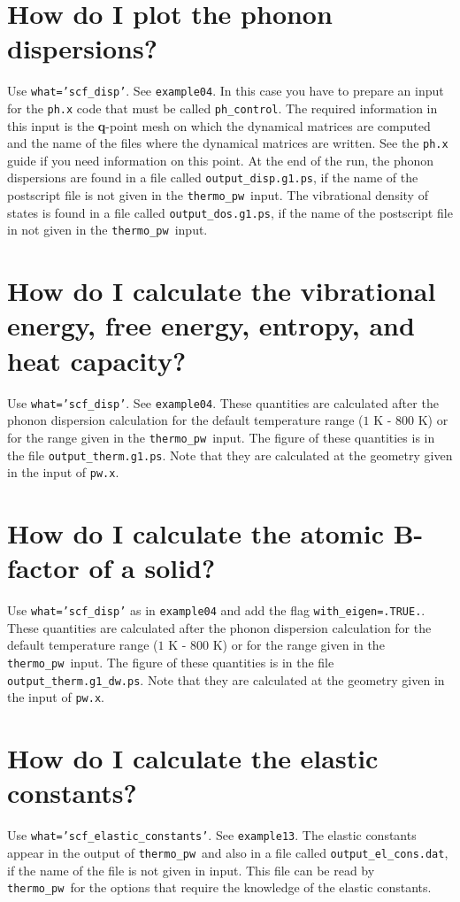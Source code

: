 \documentclass[12pt,a4paper]{article}
\def\thermo{\texttt{thermo\_pw}}
\begin{document}
\newpage
\section{\color{coral}How do I plot the phonon dispersions?}
Use \texttt{what='scf\_disp'}. See \texttt{example04}. In this case you
have to prepare an input for the \texttt{ph.x} code that must be
called \texttt{ph\_control}. The required information in this input
is the {\bf q}-point mesh on which the dynamical matrices are computed
and the name of the files where the dynamical matrices are written.
See the \texttt{ph.x} guide if you need information on this point.
At the end of the run, the phonon dispersions are found in a file 
called \texttt{output\_disp.g1.ps},
if the name of the postscript file is not given in the \thermo\ input.
The vibrational density of states is found in a file called 
\texttt{output\_dos.g1.ps}, if the name of the postscript file in not
given in the \thermo\ input.

\newpage
\section{\color{coral}How do I calculate the vibrational energy, 
free energy, entropy, and heat capacity?}
Use \texttt{what='scf\_disp'}. See \texttt{example04}. These quantities
are calculated after the phonon dispersion calculation for the default 
temperature range ($1$ K - $800$ K) or for the range
given in the \thermo\ input. The figure of these quantities is in the file 
\texttt{output\_therm.g1.ps}.
Note that they are calculated at the geometry given in the input
of \texttt{pw.x}.

\newpage
\section{\color{coral}How do I calculate the atomic B-factor of a solid?}
Use \texttt{what='scf\_disp'} as in \texttt{example04} and add the
flag \texttt{with\_eigen=.TRUE.}. These quantities
are calculated after the phonon dispersion calculation for the default 
temperature range ($1$ K - $800$ K) or for the range
given in the \thermo\ input. The figure of these quantities is in the file 
\texttt{output\_therm.g1\_dw.ps}.
Note that they are calculated at the geometry given in the input
of \texttt{pw.x}.

\newpage
\section{\color{coral}How do I calculate the elastic constants?}
Use \texttt{what='scf\_elastic\_constants'}. See \texttt{example13}. The
elastic constants appear in the output of \thermo\ and also in a file
called \texttt{output\_el\_cons.dat}, if the name of the file is not
given in input. This file can be read by \thermo\ for the options
that require the knowledge of the elastic constants.
\end{document}
